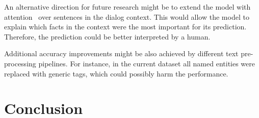 \documentclass{article} \usepackage{nips15submit_e,times}
\begin{document}
An alternative direction for future research might be to extend the model with attention~\cite{Bahdanau2014} over sentences in the dialog context. This would allow the model to explain which facts in the context were the most important for its prediction. Therefore, the prediction could be better interpreted by a human. 

Additional accuracy improvements might be also achieved by different text pre-processing pipelines. For instance, in the current dataset all named entities were replaced with generic tags, which could possibly harm the performance. 

\section{Conclusion}













\end{document}
